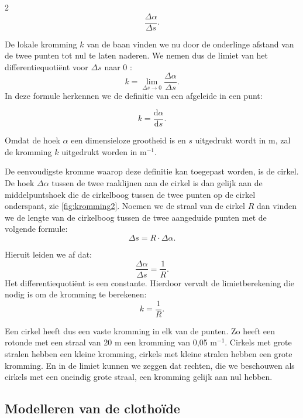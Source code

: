 \begin{multicols}{2}
\[\frac{\Delta \alpha}{\Delta s}.\]


De lokale kromming $k$ van de baan vinden we nu door de onderlinge afstand van de twee punten tot nul te laten naderen. We nemen dus de limiet van het differentiequotiënt voor $\Delta s$ naar 0 :
\[k=\lim_{\Delta s \to 0} \frac{\Delta \alpha}{\Delta s}.\]
In deze formule herkennen we de definitie van een afgeleide in een punt:

\begin{equation} k= \frac{\textrm{d} \alpha}{\textrm{d} s}. \label{afgeleide} \end{equation}

Omdat de hoek $\alpha$ een dimensieloze grootheid is en $s$ uitgedrukt wordt in m, zal de kromming $k$ uitgedrukt worden in $\textrm{m}^{-1}$.

De eenvoudigste kromme waarop deze definitie kan toegepast worden, is de cirkel. De hoek $\Delta \alpha$ tussen de twee raaklijnen aan de cirkel is dan gelijk aan de middelpuntshoek die de cirkelboog tussen de twee punten op de cirkel onderspant, zie \autoref{fig:kromming2}. Noemen we de straal van de cirkel $R$ dan vinden we de lengte van de cirkelboog tussen de twee aangeduide punten met de volgende formule:
\[\Delta s=R \cdot \Delta \alpha.\]

Hieruit leiden we af dat:
\[\frac{\Delta \alpha}{\Delta s}=\frac{1}{R}.\]
Het differentiequotiënt is een constante. Hierdoor vervalt de limietberekening die nodig is om de kromming te berekenen:
\begin{equation} k=\frac{1}{R}. \label{straalenkromming} \end{equation}


Een cirkel heeft dus een vaste kromming in elk van de punten. Zo heeft een rotonde met een straal van 20 m een kromming van 0,05 $\textrm{m}^{-1}$. Cirkels met grote stralen hebben een kleine kromming, cirkels met kleine stralen hebben een grote kromming. En in de limiet kunnen we zeggen dat rechten, die we beschouwen als cirkels met een oneindig grote straal, een kromming gelijk aan nul hebben.


\subsection{Modelleren van de clothoïde}


\end{multicols}
